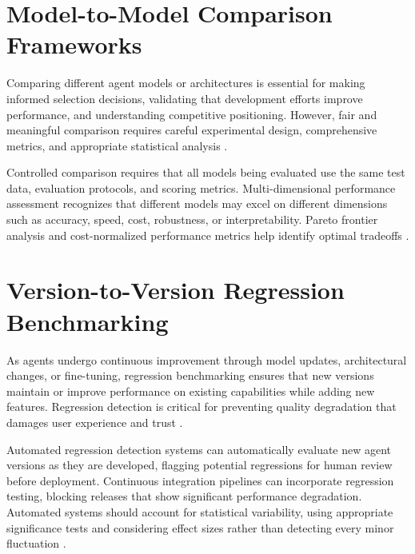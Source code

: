 
\begin{TNtwocol}
\section{Model-to-Model Comparison Frameworks}
Comparing different agent models or architectures is essential for making informed selection decisions, validating that development efforts improve performance, and understanding competitive positioning. However, fair and meaningful comparison requires careful experimental design, comprehensive metrics, and appropriate statistical analysis \cite{liang2023,dror2018,wandb2024}.

Controlled comparison requires that all models being evaluated use the same test data, evaluation protocols, and scoring metrics. Multi-dimensional performance assessment recognizes that different models may excel on different dimensions such as accuracy, speed, cost, robustness, or interpretability. Pareto frontier analysis and cost-normalized performance metrics help identify optimal tradeoffs \cite{liang2023,wandb2024}.

\section{Version-to-Version Regression Benchmarking}
As agents undergo continuous improvement through model updates, architectural changes, or fine-tuning, regression benchmarking ensures that new versions maintain or improve performance on existing capabilities while adding new features. Regression detection is critical for preventing quality degradation that damages user experience and trust \cite{zellers2019,kiela2021}.

Automated regression detection systems can automatically evaluate new agent versions as they are developed, flagging potential regressions for human review before deployment. Continuous integration pipelines can incorporate regression testing, blocking releases that show significant performance degradation. Automated systems should account for statistical variability, using appropriate significance tests and considering effect sizes rather than detecting every minor fluctuation \cite{dror2018,liang2023}.


\end{TNtwocol}
